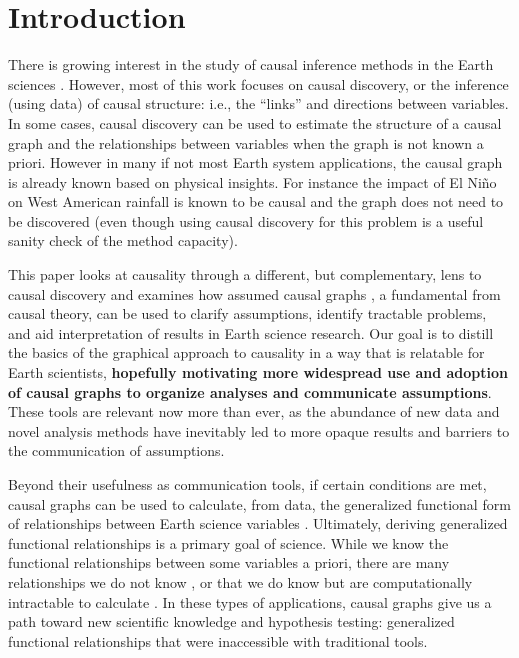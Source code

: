 \documentclass[12pt]{article}
\begin{document}
\section{Introduction}

There is growing interest in the study of causal inference methods in
the Earth sciences \citep[e.g.,][]{salvucci2002, ebert-uphoff2012,
  kretschmer2016,
  samarasinghe2020,runge-causal-timeseries,runge2019inferring,goodwell-causality-2020}. However,
most of this work focuses on causal discovery, or the inference (using
data) of causal structure: i.e., the ``links'' and directions between
variables. In some cases, causal discovery can be used to estimate the
structure of a causal graph and the relationships between variables
when the graph is not known a priori. However in many if not most
Earth system applications, the causal graph is already known based on
physical insights. For instance the impact of El Ni\~{n}o on West
American rainfall is known to be causal and the graph does not need to
be discovered (even though using causal discovery for this problem is a useful sanity check of the method capacity).

This paper looks at causality through a different, but complementary,
lens to causal discovery and examines how assumed causal graphs \citep{pearl1995causal}, a
fundamental from causal theory, can be used to clarify assumptions,
identify tractable problems, and aid interpretation of results in
Earth science research. Our goal is to distill
\citep[e.g.,][]{olah2017} the basics of the graphical approach to
causality in a way that is relatable for Earth scientists,
\textbf{hopefully motivating more widespread use and adoption of
  causal graphs to organize analyses and communicate
  assumptions}. These tools are relevant now more than ever, as the
abundance of new data and novel analysis methods have inevitably led
to more opaque results and barriers to the communication of
assumptions.

Beyond their usefulness as communication tools, if certain conditions
are met, causal graphs can be used to calculate, from data, the
generalized functional form of relationships between Earth science
variables \citep{pearl2009causality}. Ultimately, deriving generalized
functional relationships is a primary goal of science. While we know
the functional relationships between some variables a priori, there
are many relationships we do not know \citep[e.g., ecosystem scale
water and carbon fluxes;][]{massmann2019, zhou2019arid,
  zhou2019feedback, grossiord2020}, or that we do know but are
computationally intractable to calculate \citep[e.g., clouds and
microphysics at the global scale:][]{randall2003, gentine2018,
  zadra2018, gagne2020emulation}. In these types of applications,
causal graphs give us a path toward new scientific knowledge and
hypothesis testing: generalized functional relationships that were
inaccessible with traditional tools.
\end{document}
